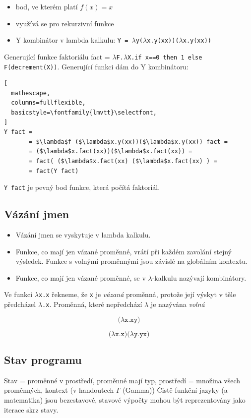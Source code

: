 \begin{itemize}
\item bod, ve kterém platí $f(x) = x$
\item využívá se pro rekurzivní funkce
\item Y kombinátor v lambda kalkulu: \texttt{Y = $\lambda$y($\lambda$x.y(xx))($\lambda$x.y(xx))}
\end{itemize}

\priklad
Generující funkce faktoriálu fact = \texttt{$\lambda$F.$\lambda$X.if x==0 then 1 else F(decrement(X))}. Generující funkci dám do Y kombinátoru:

\begin{lstlisting}[
  mathescape,
  columns=fullflexible,
  basicstyle=\fontfamily{lmvtt}\selectfont,
]
Y fact =
       = $\lambda$f ($\lambda$x.y(xx))($\lambda$x.y(xx)) fact =
       = ($\lambda$x.fact(xx))($\lambda$x.fact(xx)) =
       = fact( ($\lambda$x.fact(xx) ($\lambda$x.fact(xx) ) =
       = fact(Y fact)
\end{lstlisting}

\noindent \texttt{Y fact} je pevný bod funkce, která počítá faktoriál.

\subsection{Vázání jmen}
\begin{itemize}
\item Vázání jmen se vyskytuje v lambda kalkulu.
\item Funkce, co mají jen vázané proměnné, vrátí při každém zavolání stejný výsledek. Funkce s volnými proměnnými jsou závislé na globálním kontextu.
\item Funkce, co mají jen vázané proměnné, se v $\lambda$-kalkulu nazývají kombinátory.
\end{itemize}

\noindent Ve funkci \texttt{$\lambda$x.x} řekneme, že \texttt{x} je \textit{vázaná} proměnná, protože její výskyt v těle předcházel \texttt{$\lambda$.x}. Proměnná, které nepředchází \texttt{$\lambda$} je nazývána \textit{volná}

$$\texttt{(}\lambda\texttt{x.xy)}$$

$$\texttt{(}\lambda\texttt{x.x)(}\lambda\texttt{y.yx)}$$

\subsection{Stav programu}
Stav = proměnné v prostředí, proměnné mají typ, prostředí = množina všech proměnných, kontext (v handoutech $\Gamma$ (Gamma))
Čistě funkční jazyky (a matematika) jsou bezestavové, stavové výpočty mohou být reprezentovány jako iterace skrz stavy.

